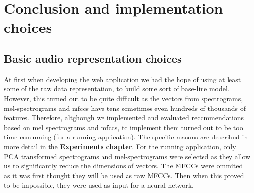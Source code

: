 \section{Conclusion and implementation choices}

\subsection{Basic audio representation choices}
At first when developing the web application we had the hope of using at least some of the raw data representation, to build some sort of base-line model. However, this turned out to be quite difficult as the vectors from spectrograms, mel-spectrograms and mfccs have tens sometimes even hundreds of thousands of features. Therefore, altghough we implemented and evaluated recommendations based on mel spectrograms and mfccs, to implement them turned out to be too time consuming (for a running application).  The specific reasons are described in more detail in the \textbf{Experiments chapter}. For the running application, only PCA transformed spectrograms and mel-spectrograms were selected as they allow us to significantly reduce the dimensions of vectors. The MFCCs were ommited as it was first thought they will be used as raw MFCCs. Then when this proved to be impossible, they were used as input for a neural network.

